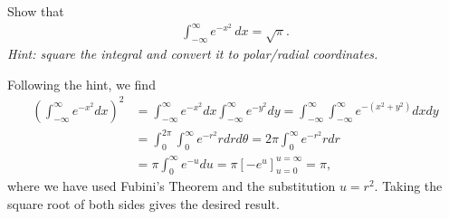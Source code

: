\documentclass[11pt]{article}
\begin{document}


\begin{exercise}
 
Show that 
\begin{align}
    \int_{-\infty}^{\infty} e^{-x^2} \, dx = \sqrt{\pi}. 
\end{align}
\textit{Hint: square the integral and convert it to polar/radial coordinates.}
\end{exercise}
\begin{solution}
    Following the hint, we find
    \begin{align}
        \left(\int_{-\infty}^\infty e^{-x^2} dx\right)^2 &= \int_{-\infty}^\infty e^{-x^2} dx \int_{-\infty}^\infty e^{-y^2} dy = \int_{-\infty}^\infty \int_{-\infty}^\infty e^{-(x^2 + y^2)} dx dy\\
        &= \int_0^{2\pi} \int_0^\infty e^{-r^2} r dr d\theta = 2\pi \int_0^\infty e^{-r^2} r dr \\
        &= \pi \int_0^\infty e^{-u} du = \pi [-e^u]_{u=0}^{u=\infty} = \pi,
    \end{align}
    where we have used Fubini's Theorem and the substitution $u = r^2$. Taking the square root of both sides gives the desired result.
\end{solution}
\end{document}
